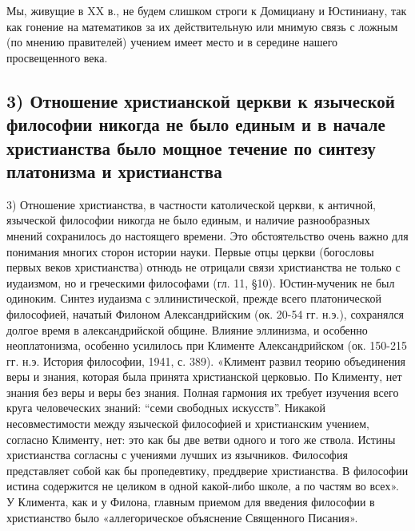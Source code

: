 Мы, живущие в XX в., не будем слишком строги к Домициану и Юстиниану,
так как гонение на математиков за их действительную или мнимую связь с
ложным (по мнению правителей) учением имеет место и в середине нашего
просвещенного века.

\subsection{3) Отношение христианской церкви к языческой философии
никогда не было единым и в начале христианства было мощное
течение по синтезу платонизма и христианства}

3) Отношение христианства, в частности католической церкви, к
античной, языческой философии никогда не было единым, и наличие
разнообразных мнений сохранилось до настоящего времени. Это
обстоятельство очень важно для понимания многих сторон истории науки.
Первые отцы церкви (богословы первых веков христианства) отнюдь не
отрицали связи христианства не только с иудаизмом, но и греческими
философами (гл. 11, §10). Юстин-мученик не был одиноким. Синтез
иудаизма с эллинистической, прежде всего платонической философией,
начатый Филоном Александрийским (ок. 20-54 гг. н.э.), сохранялся
долгое время в александрийской общине. Влияние эллинизма, и особенно
неоплатонизма, особенно усилилось при Клименте Александрийском (ок.
150-215 гг. н.э. История философии, 1941, с. 389). «Климент развил
теорию объединения веры и знания, которая была принята христианской
церковью. По Клименту, нет знания без веры и веры без знания. Полная
гармония их требует изучения всего круга человеческих знаний: ``семи
свободных искусств''. Никакой несовместимости между языческой
философией и христианским учением, согласно Клименту, нет: это как бы
две ветви одного и того же ствола. Истины христианства согласны с
учениями лучших из язычников. Философия представляет собой как бы
пропедевтику, преддверие христианства. В философии истина содержится
не целиком в одной какой-либо школе, а по частям во всех». У Климента,
как и у Филона, главным приемом для введения философии в христианство
было «аллегорическое объяснение Священного Писания».


